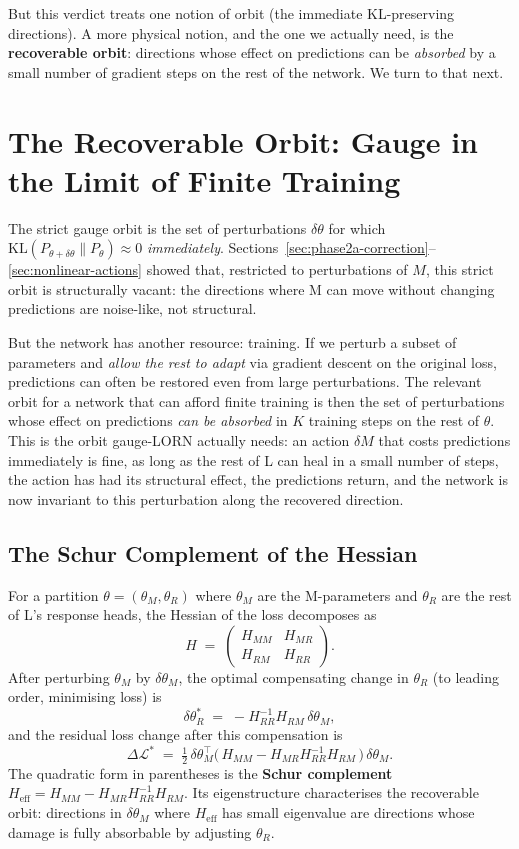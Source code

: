 \documentclass[11pt, a4paper]{article}
\theoremstyle{plain}
\theoremstyle{definition}
\theoremstyle{remark}
\begin{document}
But this verdict treats one notion of orbit (the immediate KL-preserving directions).
A more physical notion, and the one we actually need, is the \textbf{recoverable orbit}: directions whose effect on predictions can be \emph{absorbed} by a small number of gradient steps on the rest of the network.
We turn to that next.


\section{The Recoverable Orbit: Gauge in the Limit of Finite Training}
\label{sec:recoverable}

The strict gauge orbit is the set of perturbations $\delta\theta$ for which $\mathrm{KL}(P_{\theta+\delta\theta} \| P_\theta) \approx 0$ \emph{immediately}.
Sections~\ref{sec:phase2a-correction}--\ref{sec:nonlinear-actions} showed that, restricted to perturbations of $M$, this strict orbit is structurally vacant: the directions where M can move without changing predictions are noise-like, not structural.

But the network has another resource: training.
If we perturb a subset of parameters and \emph{allow the rest to adapt} via gradient descent on the original loss, predictions can often be restored even from large perturbations.
The relevant orbit for a network that can afford finite training is then the set of perturbations whose effect on predictions \emph{can be absorbed} in $K$ training steps on the rest of $\theta$.
This is the orbit gauge-LORN actually needs: an action $\delta M$ that costs predictions immediately is fine, as long as the rest of L can heal in a small number of steps, the action has had its structural effect, the predictions return, and the network is now invariant to this perturbation along the recovered direction.

\subsection{The Schur Complement of the Hessian}

For a partition $\theta = (\theta_M, \theta_R)$ where $\theta_M$ are the M-parameters and $\theta_R$ are the rest of L's response heads, the Hessian of the loss decomposes as
\[
H \;=\; \begin{pmatrix} H_{MM} & H_{MR} \\ H_{RM} & H_{RR} \end{pmatrix}.
\]
After perturbing $\theta_M$ by $\delta\theta_M$, the optimal compensating change in $\theta_R$ (to leading order, minimising loss) is
\[
\delta\theta_R^{*} \;=\; -H_{RR}^{-1} H_{RM} \,\delta\theta_M,
\]
and the residual loss change after this compensation is
\[
\Delta \mathcal{L}^{*} \;=\; \tfrac{1}{2}\,\delta\theta_M^{\!\top} \big(\, H_{MM} - H_{MR} H_{RR}^{-1} H_{RM} \,\big)\, \delta\theta_M.
\]
The quadratic form in parentheses is the \textbf{Schur complement} $H_{\text{eff}} = H_{MM} - H_{MR} H_{RR}^{-1} H_{RM}$.
Its eigenstructure characterises the recoverable orbit: directions in $\delta\theta_M$ where $H_{\text{eff}}$ has small eigenvalue are directions whose damage is fully absorbable by adjusting $\theta_R$.
\end{document}
